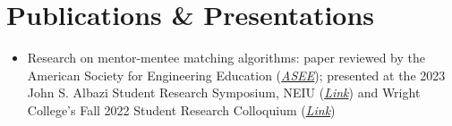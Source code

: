 \documentclass[10pt,letterpaper]{article}
\begin{document}
\section*{Publications \& Presentations}
\begin{itemize}
  \item Research on mentor-mentee matching algorithms: paper reviewed by the American Society for Engineering Education (\textit{\href{https://peer.asee.org/board-177-work-in-progress-the-development-of-a-research-based-application-for-effective-mentor-mentee-matching.pdf}{ASEE}}); presented at the 2023 John S. Albazi Student Research Symposium, NEIU (\href{https://neiudc.neiu.edu/srcas/2023/s06/4/}{\textit{Link}}) and Wright College's Fall 2022 Student Research Colloquium (\href{https://www.ccc.edu/wp-content/uploads/wright_departments_Documents_Honors-at-Wright_Student-Colloquium-Program-Fall-2022.pdf}{\textit{Link}})
\end{itemize}
\end{document}
